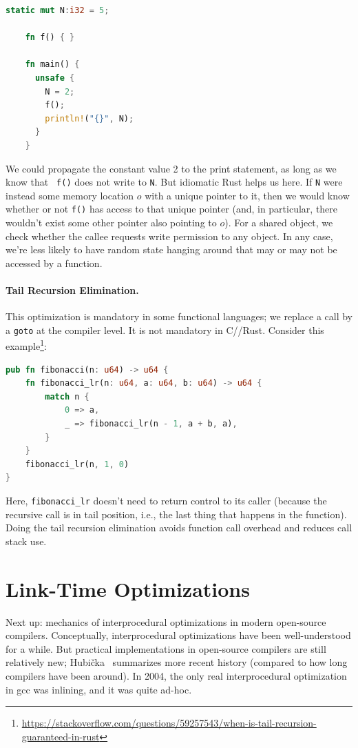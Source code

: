 {\small
\begin{lstlisting}[language=Rust]
    static mut N:i32 = 5;

    fn f() { }

    fn main() {
      unsafe { 
        N = 2;
        f();
        println!("{}", N);  
      }
    }
    \end{lstlisting}
}
We could propagate the constant value 2 to the print statement,
as long as we know that {\tt
f()} does not write to {\tt N}. But idiomatic Rust helps us
here. If \texttt{N} were instead some memory location $o$ with a unique
pointer to it, then we would know whether or not \texttt{f()} has
access to that unique pointer (and, in particular, there wouldn't exist some other
pointer also pointing to $o$). For a shared object, we check whether the callee
requests write permission to any object. In any case, we're less likely to have random
state hanging around that may or may not be accessed by a function.

\paragraph{Tail Recursion Elimination.} This optimization is mandatory
in some functional languages; we replace a call by a {\tt goto} at the
compiler level. It is not mandatory in C/\CPP/Rust.
Consider this example\footnote{\url{https://stackoverflow.com/questions/59257543/when-is-tail-recursion-guaranteed-in-rust}}:

{\small
\begin{lstlisting}[language=Rust]
pub fn fibonacci(n: u64) -> u64 {
    fn fibonacci_lr(n: u64, a: u64, b: u64) -> u64 {
        match n {
            0 => a,
            _ => fibonacci_lr(n - 1, a + b, a),
        }
    }
    fibonacci_lr(n, 1, 0)
}
\end{lstlisting}
}

Here, \texttt{fibonacci\_lr} doesn't need to return control to its caller
(because the recursive call is in tail position, i.e., the last thing that happens
in the function). Doing the tail recursion elimination avoids
function call overhead and reduces call stack use.

\section*{Link-Time Optimizations}
Next up: mechanics of interprocedural optimizations in modern open-source
compilers. Conceptually, interprocedural optimizations have been well-understood
for a while. But practical implementations in open-source compilers are still
relatively new; Hubi\v{c}ka~\cite{hubicka14:_linkt_gcc} summarizes more recent history
(compared to how long compilers have been around).
In 2004, the only real interprocedural optimization in gcc was inlining, and it was
quite ad-hoc.

